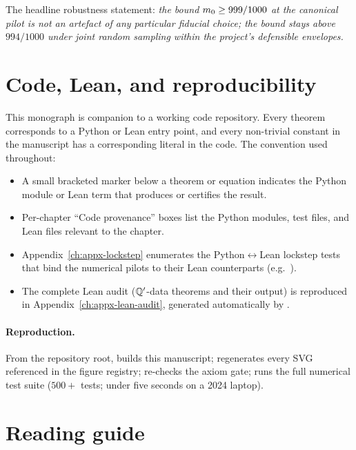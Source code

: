 The headline robustness statement: \emph{the bound
$m_0 \ge 999/1000$ at the canonical pilot is not an artefact
of any particular fiducial choice; the bound stays above
$994/1000$ under joint random sampling within the project's
defensible envelopes.}

\section{Code, Lean, and reproducibility}
\label{sec:code-and-lean}

%
This monograph is companion to a working code repository.  Every
theorem corresponds to a Python or Lean entry point, and every
non-trivial constant in the manuscript has a corresponding
literal in the code.  The convention used throughout:

\begin{itemize}[nosep]
  \item A small bracketed  marker below a
    theorem or equation indicates the Python module or Lean term
    that produces or certifies the result.
  \item Per-chapter ``Code provenance'' boxes list the Python
    modules, test files, and Lean files relevant to the chapter.
  \item Appendix~\ref{ch:appx-lockstep} enumerates the Python$\leftrightarrow$Lean
    lockstep tests that bind the numerical pilots to their Lean
    counterparts (e.g.\ ).
  \item The complete Lean audit ($\mathbb{Q}'$-data theorems and their
     output) is reproduced in
    Appendix~\ref{ch:appx-lean-audit}, generated automatically by
    .
\end{itemize}

\paragraph*{Reproduction.}  From the repository root,
 builds this manuscript;
 regenerates every SVG referenced in the
figure registry;  re-checks the axiom
gate;  runs the full numerical test suite
($500+$ tests; under five seconds on a 2024 laptop).

\section{Reading guide}
\label{sec:reading-guide}

